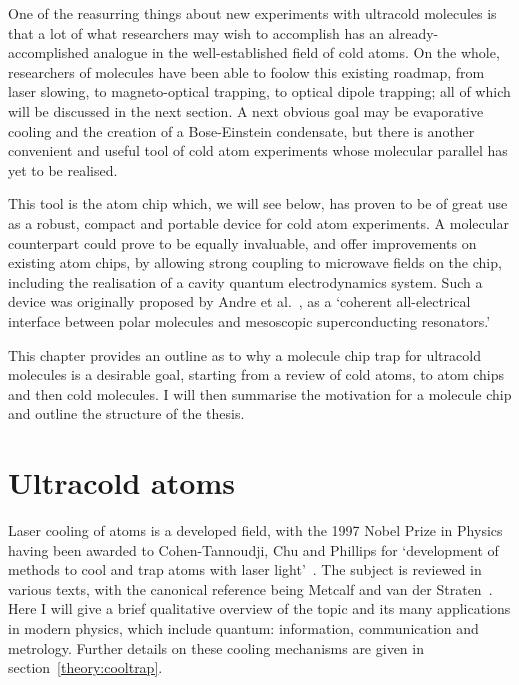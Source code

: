 
One of the reasurring things about new experiments with ultracold molecules is
that a lot of what researchers may wish to accomplish has an
already-accomplished analogue in the well-established field of cold atoms. On
the whole, researchers of molecules have been able to foolow this existing
roadmap, from laser slowing, to magneto-optical trapping, to optical dipole
trapping; all of which will be discussed in the next section. A next obvious goal may
be evaporative cooling and the creation of a Bose-Einstein condensate, but
there is another convenient and useful tool of cold atom experiments whose
molecular parallel has yet to be realised.

This tool is the atom chip which, we will see below, has proven to be of great
use as a robust, compact and portable device for cold atom experiments. A
molecular counterpart could prove to be equally invaluable, and offer
improvements on existing atom chips, by allowing strong coupling to microwave
fields on the chip, including the realisation of a cavity quantum
electrodynamics system. Such a device was originally proposed by Andre et
al.~\cite{Andre2006}, as a `coherent all-electrical interface between polar
molecules and mesoscopic superconducting resonators.'

This chapter provides an outline as to why a molecule chip trap for ultracold
molecules is a desirable goal, starting from a review of cold atoms, to atom
chips and then cold molecules. I will then summarise the motivation for a
molecule chip and outline the structure of the thesis.

\section{Ultracold atoms}

Laser cooling of atoms is a developed field, with the 1997 Nobel Prize in
Physics having been awarded to Cohen-Tannoudji, Chu and Phillips for
`development of methods to cool and trap atoms with laser
light'~\cite{RevModPhys.70.721}. The subject is reviewed in various texts, with
the canonical reference being Metcalf and van der Straten~\cite{Metcalf1999}.
Here I will give a brief qualitative overview of the topic and its many
applications in modern physics, which include quantum: information,
communication and metrology. Further details on these cooling mechanisms are
given in section~\ref{theory:cooltrap}.

